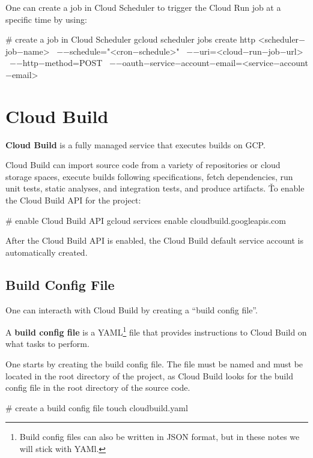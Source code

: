One can create a job in Cloud Scheduler to trigger the Cloud Run job at a specific time by using:
\begin{bash}
# create a job in Cloud Scheduler
gcloud scheduler jobs create http <scheduler$-$job$-$name> \
    $-$$-$schedule="<cron$-$schedule>" \
    $-$$-$uri=<cloud$-$run$-$job$-$url> \
    $-$$-$http$-$method=POST \
    $-$$-$oauth$-$service$-$account$-$email=<service$-$account$-$email>
\end{bash}

\section{Cloud Build}\label{sec:cloud_build}

\textbf{Cloud Build} is a fully managed service that executes builds on GCP\@.
\ed

Cloud Build can import source code from a variety of repositories or cloud storage spaces, execute builds following
specifications, fetch dependencies, run unit tests, static analyses, and integration tests, and produce artifacts. \v

To enable the Cloud Build API for the project:
\begin{bash}
# enable Cloud Build API
gcloud services enable cloudbuild.googleapis.com
\end{bash}

After the Cloud Build API is enabled, the Cloud Build default service account is automatically created.

\subsection{Build Config File}

One can interacth with Cloud Build by creating a ``build config file''.

\bd[Build Config File]
A \textbf{build config file} is a YAML\footnote{Build config files can also be written in JSON format, but in these
notes we will stick with YAMl.} file that provides instructions to Cloud Build on what tasks to perform.
\ed

One starts by creating the build config file. The file must be named \code{cloudbuild.yaml} and must be located in the
root directory of the project, as Cloud Build looks for the build config file in the root directory of the source code.
\begin{bash}
# create a build config file
touch cloudbuild.yaml
\end{bash}

